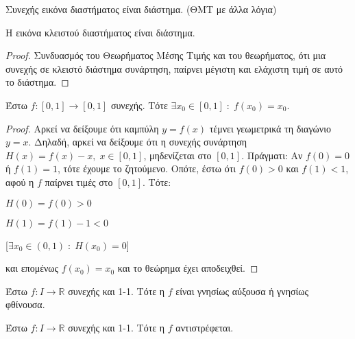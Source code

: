 \documentclass[a4paper,table]{report}
\begin{document}
\begin{thm}
  Συνεχής εικόνα διαστήματος είναι διάστημα. (ΘΜΤ με άλλα λόγια)
\end{thm}

\begin{prop}
  Η εικόνα κλειστού διαστήματος είναι διάστημα. 
\end{prop}

\begin{proof}
  Συνδυασμός του Θεωρήματος Μέσης Τιμής και του θεωρήματος, ότι μια συνεχής σε 
  κλειστό διάστημα συνάρτηση, παίρνει μέγιστη και ελάχιστη τιμή σε αυτό το διάστημα.
\end{proof}

\begin{thm}
  Έστω $ f \colon [0,1] \to [0,1] $ συνεχής. Τότε $ \exists x_{0} \in [0,1] \; 
  : \; f(x_{0}) = x_{0} $.
\end{thm}

\begin{proof}
\item {}
  Αρκεί να δείξουμε ότι καμπύλη $ y= f(x) $ τέμνει γεωμετρικά τη διαγώνιο $ y=x $.
  Δηλαδή, αρκεί να δείξουμε ότι η συνεχής συνάρτηση $ H(x) = f(x)-x, \; x \in [0,1] $, 
  μηδενίζεται στο $ [0,1] $. Πράγματι:
  Αν $ f(0)=0 $ ή $ f(1)= 1 $, τότε έχουμε το ζητούμενο. Οπότε, έστω ότι 
  $ f(0) > 0 $ και $ f(1)<1 $, αφού η $ f $ παίρνει τιμές στο $ [0,1] $. Τότε:

  \begin{minipage}{0.3\textwidth}
    \begin{myitemize}
      \item $ H(0) = f(0) > 0 $ \hfill {}
      \item $ H(1) = f(1)-1 < 0 $ \hfill {}
    \end{myitemize}
  \end{minipage}
  [$ \exists x_{0} \in (0,1) \; : \; H(x_{0}) = 0$]

  και επομένως $ f(x_{0}) = x_{0} $ και το θεώρημα έχει αποδειχθεί.
\end{proof}

\begin{thm}
  Έστω $ f \colon I \to \mathbb{R} $ συνεχής και 1-1. Τότε η $f$ είναι 
  γνησίως αύξουσα ή γνησίως φθίνουσα.
\end{thm}

\begin{thm}
  Έστω $ f \colon I \to \mathbb{R} $ συνεχής και 1-1. Τότε η $f$ αντιστρέφεται.
\end{thm}
\end{document}

